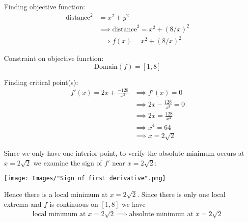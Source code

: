 \documentclass[nooutcomes]{ximera}
\renewenvironment{freeResponse}{
\ifhandout\setbox0\vbox\bgroup\else
\begin{trivlist}\item[\hskip \labelsep\bfseries Solution:\hspace{2ex}]
\fi}
{\ifhandout\egroup\else
\end{trivlist}
\fi}
\begin{document}
\begin{problem}
\begin{itemize}
\begin{freeResponse}
        Finding objective function:
        \begin{align*}
          \text{distance}^2 &= x^2 + y^2 \\
          &\implies \text{distance}^2 = x^2 + (8/x)^2\\
          &\implies f(x) =  x^2 + (8/x)^2
        \end{align*}

        Constraint on objective function:
        \[
          \text{Domain}(f) = [1, 8]
        \]

        Finding critical point(s):
        \begin{align*}
          f'(x) = 2x + \frac{-128}{x^3} &\implies f'(x) = 0 \\
          &\implies 2x - \frac{128}{x^3} = 0 \\
          &\implies 2x = \frac{128}{x^3} \\
          &\implies x^4 = 64 \\
          &\implies x = 2\sqrt{2}
        \end{align*}

        Since we only have one interior point, to verify the absolute minimum occurs at $x = 2\sqrt{2}$ we examine the sign of $f'$ near $x = 2\sqrt{2}$:
        \begin{image}
          \texttt{[image: Images/"Sign of first derivative".png]}
        \end{image}
        Hence there is a local minimum at $x = 2\sqrt{2}$.
        Since there is only one local extrema and $f$ is continuous on $[1, 8]$ we have
        \begin{align*}
          \mbox{local minimum at $x = 2\sqrt{2}$} \implies \mbox{absolute minimum at $x = 2\sqrt{2}$}
        \end{align*}
      \end{freeResponse}
  \end{itemize}
\end{problem}
\end{document}
